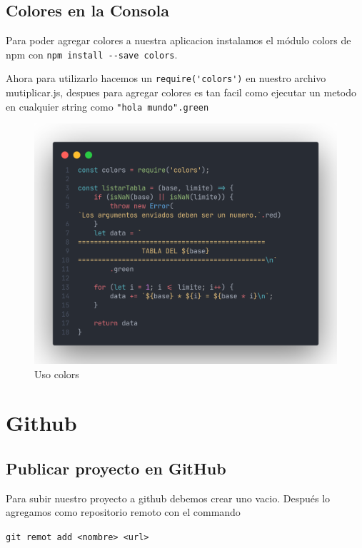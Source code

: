 \documentclass[12pt]{article}
\begin{document}
\subsection{Colores en la Consola}

Para poder agregar colores a nuestra aplicacion instalamos el módulo colors de npm con \colorbox{mygray}{\lstinline{npm install --save colors}}.

Ahora para utilizarlo hacemos un \lstinline{require('colors')} en nuestro archivo mutiplicar.js, despues para agregar colores es tan facil como ejecutar un metodo en cualquier string como  \lstinline{"hola mundo".green}

\begin{figure}[H]
    \centering
    \includegraphics[scale=.3]{assets/images/colors.png}
    \caption{Uso colors}
\end{figure}

\newpage

\section{Github}

\subsection{Publicar proyecto en GitHub}

Para subir nuestro proyecto a github debemos crear uno vacio. Después lo agregamos como repositorio remoto con el commando

\lstinline{git remot add <nombre> <url>}
\end{document}

